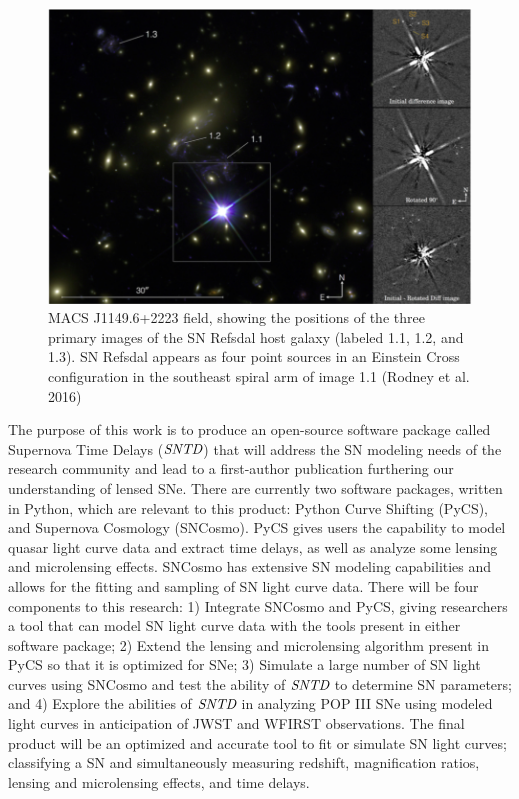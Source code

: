 \begin{figure}[h]
\centering
\includegraphics[scale=.25]{rodney_refs.png}
\caption{MACS J1149.6+2223 field, showing the positions of the three primary images of the SN Refsdal host galaxy (labeled 1.1, 1.2, and 1.3). SN Refsdal appears as four point sources in an Einstein Cross configuration in the southeast spiral arm of image 1.1 (Rodney et al. 2016)}
\end{figure}


The purpose of this work is to produce an open-source software package called Supernova Time Delays ($\textit{SNTD}$) that will address the SN modeling needs of the research community and lead to a first-author publication furthering our understanding of lensed SNe. There are currently two software packages, written in Python, which are relevant to this product: Python Curve Shifting (PyCS), and Supernova Cosmology (SNCosmo). PyCS gives users the capability to model quasar light curve data and extract time delays, as well as analyze some lensing and microlensing effects. SNCosmo has extensive SN modeling capabilities and allows for the fitting and sampling of SN light curve data. There will be four components to this research: 1) Integrate SNCosmo and PyCS, giving researchers a tool that can model SN light curve data with the tools present in either software package; 2) Extend the lensing and microlensing algorithm present in PyCS so that it is optimized for SNe; 3) Simulate a large number of SN light curves using SNCosmo and test the ability of $\textit{SNTD}$ to determine SN parameters; and 4) Explore the abilities of $\textit{SNTD}$ in analyzing POP III SNe using modeled light curves in anticipation of JWST and WFIRST observations. The final product will be an optimized and accurate tool to fit or simulate SN light curves; classifying a SN and simultaneously measuring redshift, magnification ratios, lensing and microlensing effects, and time delays.


